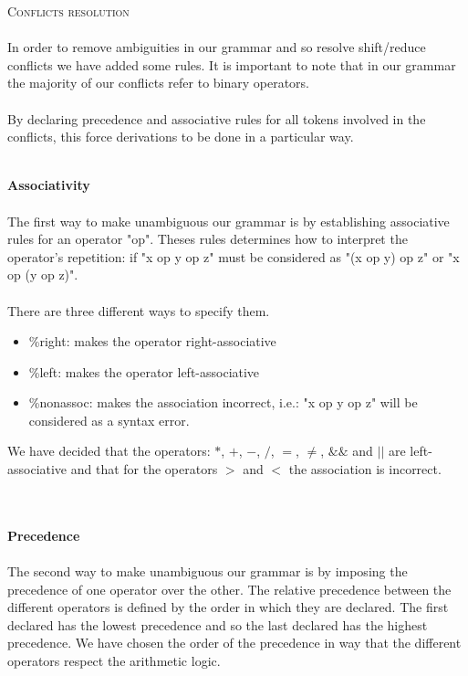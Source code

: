\documentclass[11pt]{report}
\begin{document}
\newpage
{}
{}
\vspace*{3pt}
\vspace*{10pt}
{} 
\tabto{1cm} {\Large \textsc{Conflicts resolution}}
\\ \\ 
\tabto{1cm} In order to remove ambiguities in our grammar and so resolve shift/reduce conflicts we have added some rules. It is important to note that in our grammar the majority of our conflicts refer to binary operators.  \\ \\
By declaring precedence and associative rules for all tokens involved in the conflicts, this force derivations to be done in a particular way.
\\ \\ 
{} 
\tabto{2cm} \textbf{Associativity}
\\ \\
\tabto{1cm} The first way to make unambiguous our grammar is by establishing associative rules for an operator "op". Theses rules determines how to interpret the operator's repetition: if "x op y op z" must be considered as "(x op y) op z" or "x op (y op z)". \\ \\
There are three different ways to specify them. 
\begin{itemize}
\item \%right:  makes the operator right-associative
\item \%left: makes the operator left-associative
\item \%nonassoc: makes the association incorrect, i.e.: "x op y op z" will be considered as a syntax error.
\end{itemize}
We have decided that the operators: $*$, $+$, $-$, $/$, $=$, $\ne$, $\&\&$ and $||$ are left-associative and that for the operators $>$ and $<$ the association is incorrect.
\\ \\ \\
{} 
\tabto{2cm} \textbf{Precedence}
\\ \\
\tabto{1cm} The second way to make unambiguous our grammar is by imposing the precedence of one operator over the other. The relative precedence between the different operators is defined by the order in which they are declared. The first declared has the lowest precedence and so the last declared has the highest precedence. We have chosen the order of the precedence in way that the different operators respect the arithmetic logic.
\end{document}
